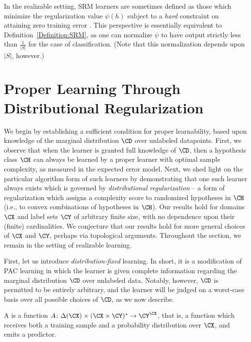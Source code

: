 \documentclass[11pt]{article}
\begin{document}
In the realizable setting, SRM learners are sometimes defined as those which minimize the regularization value $\psi(h)$ subject to a \emph{hard} constraint on attaining zero training error \citep{asilis2024open}. This perspective is essentially equivalent to Definition~\ref{Definition:SRM}, as one can normalize $\psi$ to have output strictly less than $\frac{1}{|S|}$ for the case of classification. (Note that this normalization depends upon $|S|$, however.)

\section{Proper Learning Through Distributional Regularization}\label{Section:proper-learning-through-dist-regularization}

We begin by establishing a sufficient condition for proper learnability, based upon knowledge of the marginal distribution $\CD$ over unlabeled datapoints. First, we observe that when the learner is granted full knowledge of $\CD$, then a hypothesis class $\CH$ can always be learned by a proper learner with optimal sample complexity, as measured in the expected error model. Next, we shed light on the particular algorithm form of such learners by demonstrating that one such learner always exists which is governed by \emph{distributional regularization} -- a form of regularization which assigns a complexity score to randomized hypotheses in $\CH$ (i.e., to convex combinations of hypotheses in $\CH$). Our results hold for domains $\CX$ and label sets $\CY$ of arbitrary finite size, with no dependence upon their (finite) cardinalities. We conjecture that our results hold for more general choices of $\CX$ and $\CY$, perhaps via topological arguments. Throughout the section, we remain in the setting of realizable learning. 

First, let us introduce \emph{distribution-fixed} learning. In short, it is a modification of PAC learning in which the learner is given complete information regarding the marginal distribution $\CD$ over unlabeled data. Notably, however, $\CD$ is permitted to be entirely arbitrary, and the learner will be judged on a worst-case basis over all possible choices of $\CD$, as we now describe.

\begin{definition}\label{Definition:distribution-fixed-learner}
A  is a function $A \colon \Delta(\CX) \times (\CX \times \CY)^* \to \CY^\CX$, that is, a function which receives both a training sample and a probability distribution over $\CX$, and emits a predictor. 
\end{definition}
\end{document}
